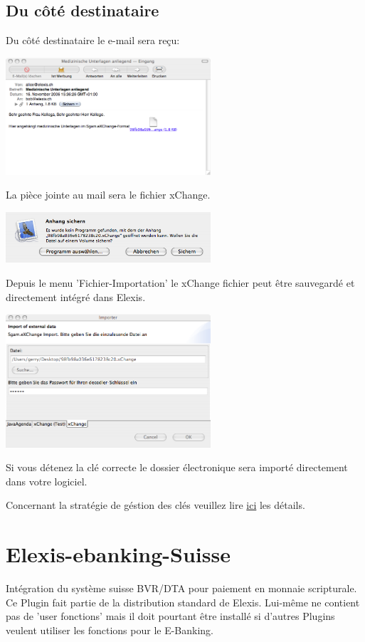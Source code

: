 \subsection{Du côté destinataire}
Du côté destinataire le e-mail sera reçu:

\includegraphics[width=3in]{images/import1.png}

La pièce jointe au mail sera le fichier xChange.

\includegraphics[width=3in]{images/import2.png}

Depuis le menu 'Fichier-Importation' le xChange fichier peut être sauvegardé et directement intégré dans Elexis.

\includegraphics[width=3in]{images/import3.png}



Si vous détenez la clé correcte le dossier électronique sera importé directement dans votre logiciel. 

Concernant la stratégie de géstion des clés veuillez lire \href{http://www.elexis.ch/jp/index.php?option=content&task=view&id=64}{ici} les détails.

\section{Elexis-ebanking-Suisse}
Intégration du système suisse BVR/DTA pour paiement en monnaie scripturale. Ce Plugin fait partie de la distribution standard de Elexis. Lui-même ne contient pas de 'user fonctions' mais il doit pourtant être installé si d'autres Plugins veulent utiliser les fonctions pour le E-Banking. 